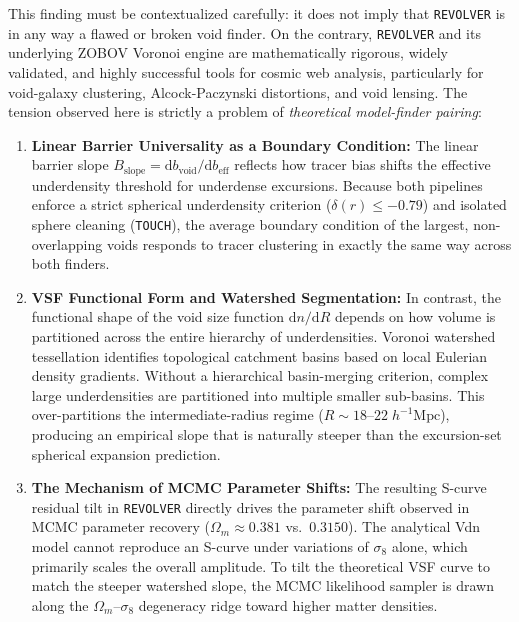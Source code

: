 \documentclass[12pt]{report}
\begin{document}
This finding must be contextualized carefully: it does not imply that \texttt{REVOLVER} is in any way a flawed or broken void finder. On the contrary, \texttt{REVOLVER} \citep{Nadathur2019} and its underlying ZOBOV Voronoi engine \citep{Neyrinck2008} are mathematically rigorous, widely validated, and highly successful tools for cosmic web analysis, particularly for void-galaxy clustering, Alcock-Paczynski distortions, and void lensing. The tension observed here is strictly a problem of \emph{theoretical model-finder pairing}:
\begin{enumerate}
    \item \textbf{Linear Barrier Universality as a Boundary Condition:} The linear barrier slope $B_{\mathrm{slope}} = \mathrm{d}b_{\mathrm{void}}/\mathrm{d}b_{\mathrm{eff}}$ reflects how tracer bias shifts the effective underdensity threshold for underdense excursions. Because both pipelines enforce a strict spherical underdensity criterion ($\delta(r) \le -0.79$) and isolated sphere cleaning (\texttt{TOUCH}), the average boundary condition of the largest, non-overlapping voids responds to tracer clustering in exactly the same way across both finders.
    \item \textbf{VSF Functional Form and Watershed Segmentation:} In contrast, the functional shape of the void size function $\mathrm{d}n/\mathrm{d}R$ depends on how volume is partitioned across the entire hierarchy of underdensities. Voronoi watershed tessellation identifies topological catchment basins based on local Eulerian density gradients. Without a hierarchical basin-merging criterion, complex large underdensities are partitioned into multiple smaller sub-basins. This over-partitions the intermediate-radius regime ($R \sim 18$--$22\;h^{-1}\mathrm{Mpc}$), producing an empirical slope that is naturally steeper than the excursion-set spherical expansion prediction.
    \item \textbf{The Mechanism of MCMC Parameter Shifts:} The resulting S-curve residual tilt in \texttt{REVOLVER} directly drives the parameter shift observed in MCMC parameter recovery ($\Omega_m \approx 0.381$ vs.\ $0.3150$). The analytical Vdn model cannot reproduce an S-curve under variations of $\sigma_8$ alone, which primarily scales the overall amplitude. To tilt the theoretical VSF curve to match the steeper watershed slope, the MCMC likelihood sampler is drawn along the $\Omega_m$--$\sigma_8$ degeneracy ridge toward higher matter densities. 
\end{enumerate}
\end{document}
